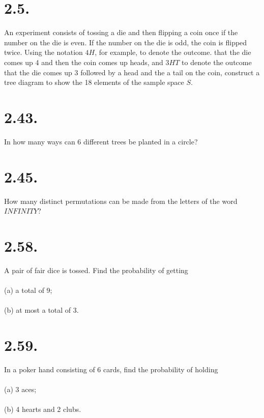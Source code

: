 \documentclass[../main.tex]{subfiles}
\begin{document}
\section{2.5.}

An experiment consists of tossing a die and then flipping a coin once if the number on the die is even. If the number on the die is odd, the coin is flipped twice.
Using the notation $4H$, for example, to denote the outcome. that the die comes up 4 and then the coin comes up heads,
and $3HT$ to denote the outcome that the die comes up 3 followed by a head and the a tail on the coin,
construct a tree diagram to show the 18 elements of the sample space $S$.

\vspace{15em}

\section{2.43.}
In how many ways can 6 different trees be planted in a circle?

\vspace{15em}

\section{2.45.}
How many distinct permutations can be made from the letters of the word $INFINITY$?

\vspace{15em}

\section{2.58.}
A pair of fair dice is tossed. Find the probability of getting
\\\\
(a) a total of 9;
\\\\
(b) at most a total of 3.

\vspace{15em}

\section{2.59.}
In a poker hand consisting of 6 cards, find the probability of holding 
\\\\
(a) 3 aces;
\\\\
(b) 4 hearts and 2 clubs.
\end{document}
